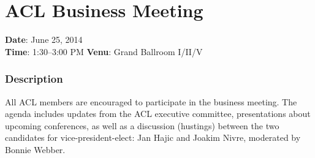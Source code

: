 \vspace*{-3cm}\par
\chapter[ACL Business Meeting]{ACL Business Meeting}
\thispagestyle{emptyheader}

\textbf{Date}: June 25, 2014 \\
\textbf{Time}: 1:30--3:00 PM
\textbf{Venu}: Grand Ballroom I/II/V

\subsection*{Description}

All ACL members are encouraged to participate in the business
meeting. The agenda includes updates from the ACL executive committee,
presentations about upcoming conferences, as well as a discussion
(hustings) between the two candidates for vice-president-elect: Jan
Hajic and Joakim Nivre, moderated by Bonnie Webber.

